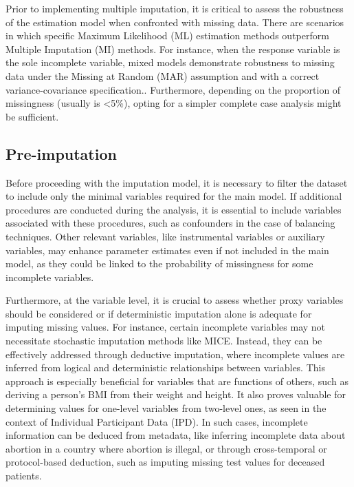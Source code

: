 \documentclass[
  article]{jss}
\begin{document}
Prior to implementing multiple imputation, it is critical to assess the
robustness of the estimation model when confronted with missing data.
There are scenarios in which specific Maximum Likelihood (ML) estimation
methods outperform Multiple Imputation (MI) methods. For instance, when
the response variable is the sole incomplete variable, mixed models
demonstrate robustness to missing data under the Missing at Random (MAR)
assumption and with a correct variance-covariance
specification.\cite{Molenberghs_2007}. Furthermore, depending on the
proportion of missingness (usually is \textless5\%), opting for a
simpler complete case analysis might be sufficient.

\hypertarget{pre-imputation}{%
\subsection{Pre-imputation}\label{pre-imputation}}

Before proceeding with the imputation model, it is necessary to filter
the dataset to include only the minimal variables required for the main
model. If additional procedures are conducted during the analysis, it is
essential to include variables associated with these procedures, such as
confounders in the case of balancing techniques. Other relevant
variables, like instrumental variables or auxiliary variables, may
enhance parameter estimates even if not included in the main model, as
they could be linked to the probability of missingness for some
incomplete variables.

Furthermore, at the variable level, it is crucial to assess whether
proxy variables should be considered or if deterministic imputation
alone is adequate for imputing missing values. For instance, certain
incomplete variables may not necessitate stochastic imputation methods
like MICE. Instead, they can be effectively addressed through deductive
imputation, where incomplete values are inferred from logical and
deterministic relationships between variables. This approach is
especially beneficial for variables that are functions of others, such
as deriving a person's BMI from their weight and height. It also proves
valuable for determining values for one-level variables from two-level
ones, as seen in the context of Individual Participant Data (IPD). In
such cases, incomplete information can be deduced from metadata, like
inferring incomplete data about abortion in a country where abortion is
illegal, or through cross-temporal or protocol-based deduction, such as
imputing missing test values for deceased patients.
\end{document}
